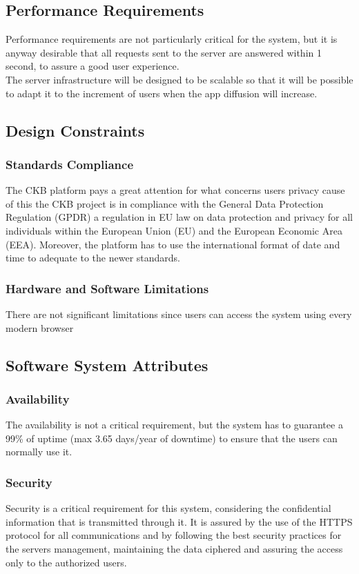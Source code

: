 \subsection{Performance Requirements}
Performance requirements are not particularly critical for the system, but it is anyway desirable that all requests sent to the server are answered within 1 second, to assure a good user experience.\\
The server infrastructure will be designed to be scalable so that it will be possible to adapt it to the increment of users when the app diffusion will increase.
\subsection{Design Constraints}
\subsubsection{Standards Compliance}
The CKB platform pays a great attention for what concerns users privacy cause of this
the CKB project is in compliance with the General Data Protection Regulation (GPDR)
a regulation in EU law on data protection and privacy for all individuals within the
European Union (EU) and the European Economic Area (EEA). Moreover, the platform
has to use the international format of date and time to adequate to the newer standards.

\subsubsection{Hardware and Software Limitations}
There are not significant limitations since users can access the system using every modern browser
\subsection{Software System Attributes}
\subsubsection{Availability}
The availability is not a critical requirement, but the system has to guarantee a 99\% of uptime (max 3.65 days/year of downtime) to ensure that the users can normally use it.
\subsubsection{Security}
Security is a critical requirement for this system, considering the confidential information that is transmitted through it. It is assured by the use of the HTTPS protocol for all communications and by following the best security practices for the servers management, maintaining the data ciphered and assuring the access only to the authorized users.
